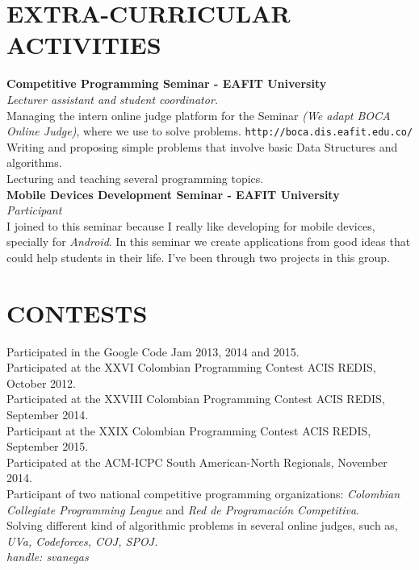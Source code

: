 \documentclass[margin, 10pt]{res} %
\begin{document}
\begin{resume}

\section{EXTRA-CURRICULAR \\ ACTIVITIES}
\textbf{Competitive Programming Seminar - EAFIT University} \\
\textit{Lecturer assistant and student coordinator.} \\
Managing the intern online judge platform for the Seminar {\sl (We adapt BOCA Online Judge)},
where we use to solve problems. \texttt{http://boca.dis.eafit.edu.co/} \\
Writing and proposing simple problems that involve basic Data Structures and algorithms. \\
Lecturing and teaching several programming topics. \\

\textbf{Mobile Devices Development Seminar - EAFIT University} \\
\textit{Participant} \\
I joined to this seminar because I really like developing for mobile devices, specially for
\emph{Android}. In this seminar we create applications from good ideas that could help
students in their life. I've been through two projects in this group.


\section{CONTESTS}
Participated in the Google Code Jam 2013, 2014 and 2015. \\
Participated at the XXVI Colombian Programming Contest ACIS REDIS, October 2012. \\ 
Participated at the XXVIII Colombian Programming Contest ACIS REDIS, September 2014. \\
Participant at the XXIX Colombian Programming Contest ACIS REDIS, September 2015. \\
Participated at the ACM-ICPC South American-North Regionals, November 2014. \\
Participant of two national competitive programming organizations: \emph{Colombian Collegiate
Programming League} and \emph{Red de Programación Competitiva}.\\
Solving different kind of algorithmic problems in several online judges, such as,
{\sl UVa, Codeforces, COJ, SPOJ.}\\ {\sl handle: svanegas}\\


\end{resume}
\end{document}
